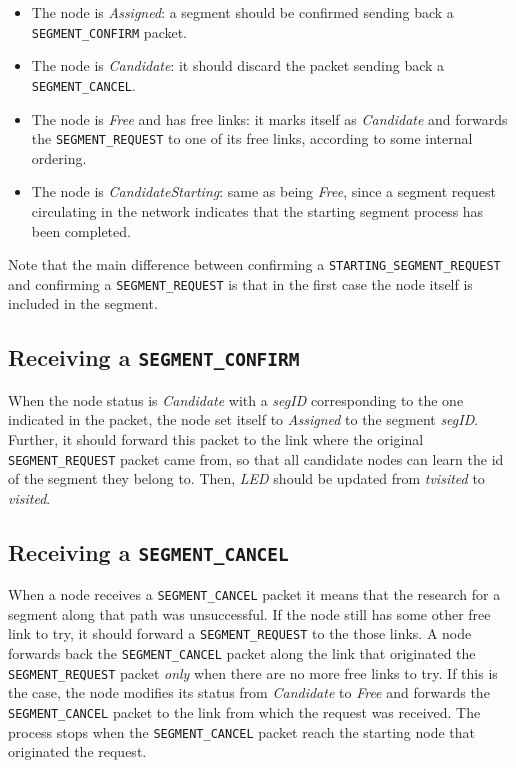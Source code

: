 \begin{itemize}
\item The node is \emph{Assigned}: a segment should be confirmed
sending back a \texttt{SEGMENT\_CONFIRM} packet.
\item The node is \emph{Candidate}: it should discard the packet sending
back a \texttt{SEGMENT\_CANCEL}.
\item The node is \emph{Free} and has free
links: it marks itself as \emph{Candidate} and forwards the \texttt{SEGMENT\_REQUEST}
to one of its free links, according to some internal ordering.
\item The node is \emph{CandidateStarting}: same as being \emph{Free},
since a segment request circulating in the network indicates that the
starting segment process has been completed.
\end{itemize}

Note that the main difference between confirming a \texttt{STARTING\_SEGMENT\_REQUEST}
and confirming a \texttt{SEGMENT\_REQUEST} is that in the first case the node
itself is included in the segment.


\subsection{Receiving a \texttt{SEGMENT\_CONFIRM}}
When the node status is \emph{Candidate} with a \emph{segID} corresponding to the one indicated in
the packet, the node set itself to \emph{Assigned} to the segment \emph{segID}. 
Further, it should forward this packet to the link where the
original \texttt{SEGMENT\_REQUEST} packet came from, so that all candidate nodes
can learn the id of the segment they belong to. Then, \emph{LED} should be
updated from \emph{tvisited} to \emph{visited}.

\subsection{Receiving a \texttt{SEGMENT\_CANCEL}}
When a node receives a \texttt{SEGMENT\_CANCEL} packet it means that the research
for a segment along that path was unsuccessful. If the
node still has some other free link to try, it should forward a
\texttt{SEGMENT\_REQUEST} to the those links. A node forwards back
the \texttt{SEGMENT\_CANCEL} packet along the link that originated the
\texttt{SEGMENT\_REQUEST} packet \emph{only} when there are no more free
links to try. If this is the case, the node modifies its status from
\emph{Candidate} to \emph{Free} and forwards the
\texttt{SEGMENT\_CANCEL} packet to the link from which the request was
received. The process stops when the \texttt{SEGMENT\_CANCEL} packet
reach the starting node that originated the request.

